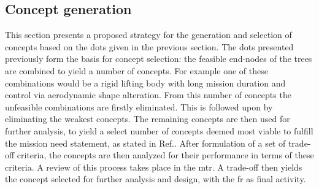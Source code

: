\subsection{Concept generation}
This section presents a proposed strategy for the generation and selection of concepts based on the \gls{dot}s given in the previous section. The \gls{dot}s presented previously form the basis for concept selection: the feasible end-nodes of the trees are combined to yield a number of concepts. For example one of these combinations would be a rigid lifting body with long mission duration and control via aerodynamic shape alteration. From this number of concepts the unfeasible combinations are firstly eliminated. This is followed upon by eliminating the weakest concepts. The remaining concepts are then used for further analysis, to yield a select number of concepts deemed most viable to fulfill the mission need statement, as stated in Ref.\cite{Balasooriyan2015}. After formulation of a set of trade-off criteria, the concepts are then analyzed for their performance in terms of these criteria. A review of this process takes place in the \gls{mtr}. A trade-off then yields the concept selected for further analysis and design, with the \gls{fr} as final activity.